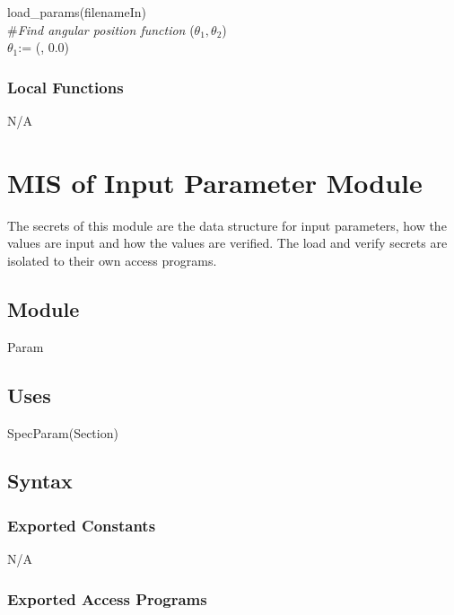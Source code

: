 \documentclass[12pt, titlepage]{article}
\begin{document}
\noindent load\_params(filenameIn)\\

\noindent \#\textit{Find angular position function} ($\theta_1, \theta_2$)\\


\noindent $\theta_1$:= (, 0.0)\\






\subsubsection{Local Functions}
N/A

\newpage

\section{MIS of Input Parameter Module} \label{IPModule} 
The secrets of this module are the data structure for input parameters, how the values are input and how the values are verified. The load and verify secrets are isolated to their own access programs.

\subsection{Module}

Param

\subsection{Uses}
SpecParam(Section)

\subsection{Syntax}

\subsubsection{Exported Constants}

N/A

\subsubsection{Exported Access Programs}
\end{document}
